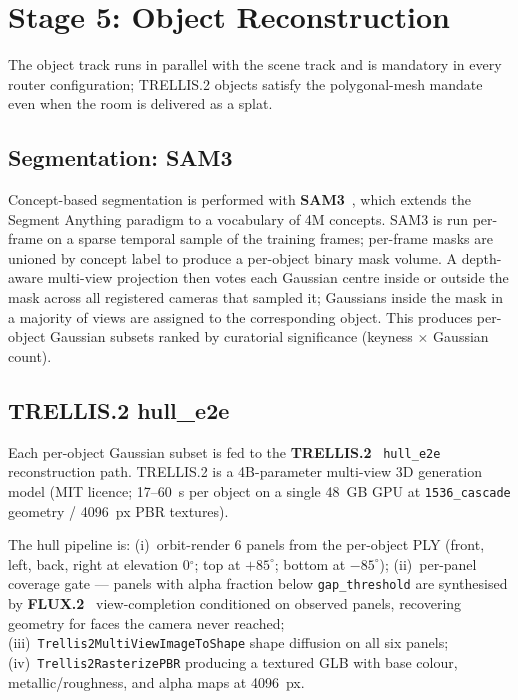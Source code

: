 \section{Stage 5: Object Reconstruction}
\label{sec:method:objects}

The object track runs in parallel with the scene track and is mandatory in every router
configuration; TRELLIS.2 objects satisfy the polygonal-mesh mandate even when the room is
delivered as a splat.

\subsection{Segmentation: SAM3}
Concept-based segmentation is performed with \textbf{SAM3}~\cite{sam3dobjects2025}, which
extends the Segment Anything paradigm to a vocabulary of 4M concepts.  SAM3 is run
per-frame on a sparse temporal sample of the training frames; per-frame masks are unioned
by concept label to produce a per-object binary mask volume.  A depth-aware multi-view
projection then votes each Gaussian centre inside or outside the mask across all
registered cameras that sampled it; Gaussians inside the mask in a majority of views are
assigned to the corresponding object.  This produces per-object Gaussian subsets ranked
by curatorial significance (keyness $\times$ Gaussian count).

\subsection{TRELLIS.2 hull\_e2e}
\label{sec:method:trellis}
Each per-object Gaussian subset is fed to the \textbf{TRELLIS.2}~\cite{xiang2025_trellis2}
\texttt{hull\_e2e} reconstruction path.  TRELLIS.2 is a 4B-parameter multi-view 3D
generation model (MIT licence; 17--60~s per object on a single 48~GB GPU at
\texttt{1536\_cascade} geometry / 4096~px PBR textures).

The hull pipeline is: (i)~orbit-render 6 panels from the per-object PLY (front, left,
back, right at elevation 0$^\circ$; top at $+85^\circ$; bottom at $-85^\circ$);
(ii)~per-panel coverage gate --- panels with alpha fraction below \texttt{gap\_threshold}
are synthesised by \textbf{FLUX.2}~\cite{flux2025} view-completion conditioned on
observed panels, recovering geometry for faces the camera never reached;
(iii)~\texttt{Trellis2MultiViewImageToShape} shape diffusion on all six panels;
(iv)~\texttt{Trellis2RasterizePBR} producing a textured GLB with base colour,
metallic/roughness, and alpha maps at 4096~px.

